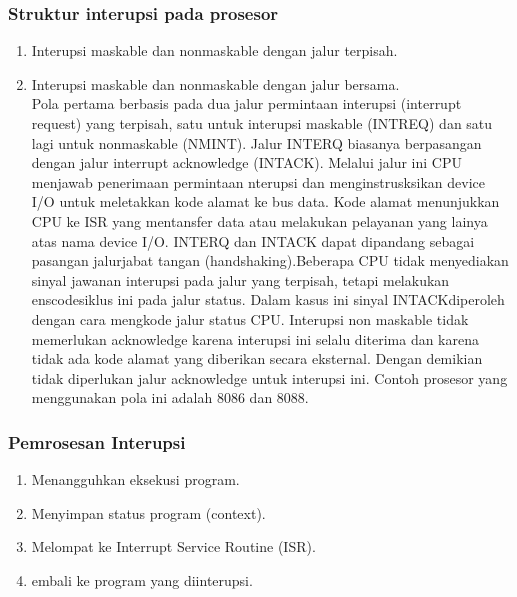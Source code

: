 \documentclass[12pt]{article}
\begin{document}
\subsubsection{Struktur interupsi pada prosesor}
\begin{enumerate}
    \item Interupsi maskable dan nonmaskable dengan jalur terpisah.
\item Interupsi maskable dan nonmaskable dengan jalur bersama.\\
    Pola pertama berbasis pada dua jalur permintaan interupsi (interrupt request) yang terpisah, satu untuk interupsi maskable (INTREQ) dan satu lagi untuk nonmaskable (NMINT). Jalur INTERQ biasanya berpasangan dengan jalur interrupt acknowledge (INTACK). Melalui jalur ini CPU menjawab penerimaan permintaan nterupsi dan menginstrusksikan device I/O untuk meletakkan kode alamat ke bus data. Kode alamat menunjukkan CPU ke ISR yang mentansfer data atau melakukan pelayanan yang lainya atas nama device I/O. INTERQ dan INTACK dapat dipandang sebagai pasangan jalurjabat tangan (handshaking).Beberapa CPU tidak menyediakan sinyal jawanan interupsi pada jalur yang terpisah, tetapi melakukan enscodesiklus ini pada jalur status. Dalam kasus ini sinyal INTACKdiperoleh dengan cara mengkode jalur status CPU. Interupsi non maskable tidak memerlukan acknowledge karena interupsi ini selalu diterima dan karena tidak ada kode alamat yang diberikan secara eksternal. Dengan demikian tidak diperlukan jalur acknowledge untuk interupsi ini. Contoh prosesor yang menggunakan pola ini adalah 8086 dan 8088.
\end{enumerate}
\subsubsection{Pemrosesan Interupsi}
\begin{enumerate}
    \item Menangguhkan eksekusi program.
    \item Menyimpan status program (context).
    \item Melompat ke Interrupt Service Routine (ISR).
    \item embali ke program yang diinterupsi.
\end{enumerate}
\end{document}
